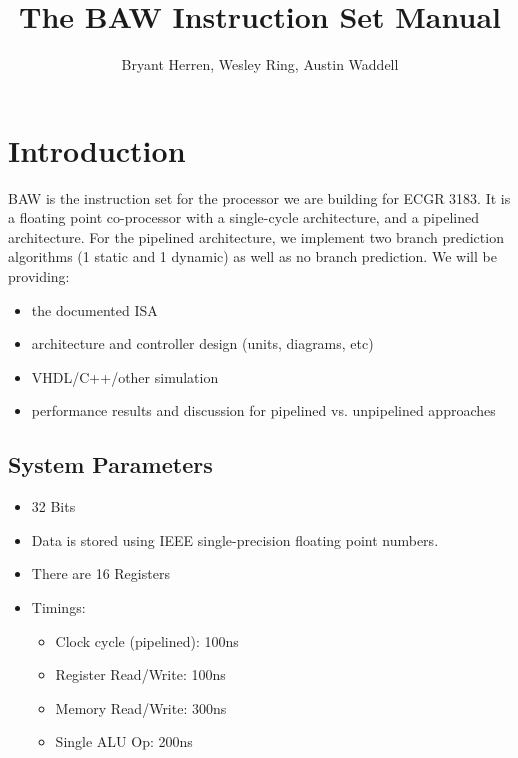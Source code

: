\documentclass[a4paper,14pt]{article}
\title{The BAW Instruction Set Manual}
\author{Bryant Herren, Wesley Ring, Austin Waddell}
\date{}
\begin{document}
\null  %
\nointerlineskip  %
\vfill
\let\snewpage \newpage
\let\newpage \relax
\maketitle
\let \newpage \snewpage
\vfill 
\newpage

{\hypersetup{linktoc=all,hidelinks}
\tableofcontents
}
\newpage

\section{Introduction}
BAW is the instruction set for the processor we are building for ECGR 3183. It is a floating point co-processor with a single-cycle architecture, and a pipelined architecture. For the pipelined architecture, we implement two branch prediction algorithms (1 static and 1 dynamic) as well as no branch prediction.
\newline\newline
We will be providing:
\begin{itemize}
    \setlength{\parskip}{0pt}
    \setlength{\itemsep}{0pt plus 1pt}
    \item the documented ISA
    \item architecture and controller design (units, diagrams, etc)
    \item VHDL/C++/other simulation
    \item performance results and discussion for pipelined vs. unpipelined approaches
\end{itemize}


\subsection{System Parameters}
\begin{itemize}
    \setlength{\parskip}{0pt}
    \setlength{\itemsep}{0pt plus 1pt}
    \item 32 Bits
    \item Data is stored using IEEE single-precision floating point numbers.
    \item There are 16 Registers
    \item Timings:
    \begin{itemize}
        \setlength{\parskip}{0pt}
        \item Clock cycle (pipelined): 100ns
        \item Register Read/Write: 100ns
        \item Memory Read/Write: 300ns
        \item Single ALU Op: 200ns
    \end{itemize}
\end{itemize}
\end{document}
